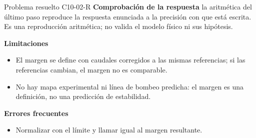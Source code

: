 \documentclass[10pt,openany]{book}
\begin{document}
\begin{studiumworked}{Problema resuelto C10-02-R}
\noindent\textbf{Comprobación de la respuesta} la aritmética del último paso reproduce la respuesta enunciada a la precisión con que está escrita. Es una reproducción aritmética; no valida el modelo físico ni sus hipótesis.

\noindent\textbf{Limitaciones}
\begin{itemize}
\item El margen se define con caudales corregidos a las mismas referencias; si las referencias cambian, el margen no es comparable.
\item No hay mapa experimental ni línea de bombeo predicha: el margen es una definición, no una predicción de estabilidad.
\end{itemize}

\noindent\textbf{Errores frecuentes}
\begin{itemize}
\item Normalizar con el límite y llamar igual al margen resultante.
\end{itemize}
\end{studiumworked}
\end{document}
